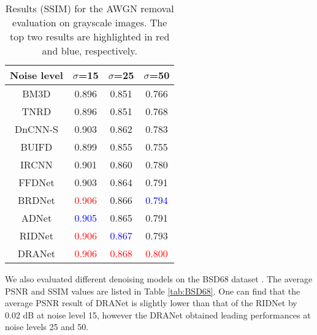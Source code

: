 \documentclass[3p,times]{elsarticle}
\begin{document}
\begin{table}[htbp]
\centering
\caption{Results (SSIM) for the AWGN removal evaluation on grayscale images. The top two results are highlighted in red and blue, respectively.}
\label{tab:Set12_SSIM}
\begin{tabular}{cccc}
\hline
Noise level & $\sigma$=15 & $\sigma$=25 & $\sigma$=50 \\
\hline
BM3D \cite{Dabov2007} & 0.896 & 0.851 & 0.766\\
\hline
TNRD \cite{Chen2017} & 0.896 &  0.851 & 0.768 \\
\hline
DnCNN-S \cite{Zhang2017} & 0.903 & 0.862 & 0.783 \\
\hline
BUIFD \cite{Helou2020} &  0.899 & 0.855 & 0.755 \\
\hline
IRCNN  \cite{ZhangZGZ2017} & 0.901 & 0.860 & 0.780 \\
\hline
FFDNet \cite{Zhang2018} & 0.903 & 0.864 & 0.791 \\
\hline
BRDNet \cite{Tian2020} & \textcolor{red}{0.906} & 0.866 & \textcolor{blue}{0.794} \\
\hline
ADNet \cite{TianX2020} & \textcolor{blue}{0.905} & 0.865 & 0.791 \\
\hline
RIDNet \cite{Anwar2019} & \textcolor{red}{0.906} & \textcolor{blue}{0.867} & 0.793 \\
\hline
DRANet & \textcolor{red}{0.906} & \textcolor{red}{0.868} & \textcolor{red}{0.800} \\
\hline
\end{tabular}
\end{table}

We also evaluated different denoising models on the BSD68 dataset \cite{Roth2005}. The average PSNR and SSIM values are listed in Table \ref{tab:BSD68}. One can find that the average PSNR result of DRANet is slightly lower than that of the RIDNet by 0.02 dB at noise level 15, however the DRANet obtained leading performances at noise levels 25 and 50.
\end{document}
